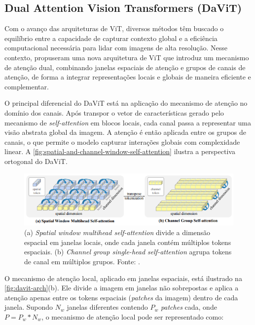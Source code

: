 \subsection{Dual Attention Vision Transformers (DaViT)}

Com o avanço das arquiteturas de ViT, diversos métodos têm buscado o equilíbrio entre a capacidade de capturar contexto global e a eficiência computacional necessária para lidar com imagens de alta resolução. Nesse contexto, \cite{ding2022davitdualattentionvision} propuseram uma nova arquitetura de ViT que introduz um mecanismo de atenção dual, combinando janelas espaciais de atenção e grupos de canais de atenção, de forma a integrar representações locais e globais de maneira eficiente e complementar.

O principal diferencial do DaViT está na aplicação do mecanismo de atenção no domínio dos canais. Após transpor o vetor de características gerado pelo mecanismo de \textit{self-attention} em blocos locais, cada canal passa a representar uma visão abstrata global da imagem. A atenção é então aplicada entre os grupos de canais, o que permite o modelo capturar interações globais com complexidade linear. A \autoref{fig:spatial-and-channel-window-self-attention} ilustra a perspectiva ortogonal do DaViT.

\begin{figure}[h]
    \centering
    \includegraphics[width=\linewidth]{figs/spatial-and-channel-window-self-attention.png}
    \caption{(a) \textit{Spatial window multihead self-attention} divide a dimensão espacial em janelas locais, onde cada janela contém múltiplos tokens espaciais. (b) \textit{Channel group single-head self-attention} agrupa tokens de canal em múltiplos grupos. Fonte: \cite{ding2022davitdualattentionvision}.}
    \label{fig:spatial-and-channel-window-self-attention}
\end{figure}

O mecanismo de atenção local, aplicado em janelas espaciais, está ilustrado na \autoref{fig:davit-arch}(b). Ele divide a imagem em janelas não sobrepostas e aplica a atenção apenas entre os tokens espaciais (\textit{patches} da imagem) dentro de cada janela. Supondo $N_w$ janelas diferentes contendo $P_w$ \textit{patches} cada, onde $P=P_w * N_w$, o mecanismo de atenção local pode ser representado como:

